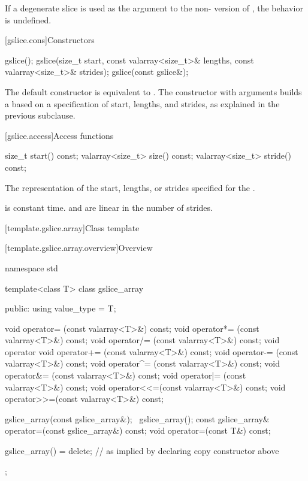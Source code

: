 \pnum
If a degenerate slice is used as the argument to the
non-
version of
,
the behavior is undefined.
%

[gslice.cons]{Constructors}

%
\begin{itemdecl}
gslice();
gslice(size_t start, const valarray<size_t>& lengths,
       const valarray<size_t>& strides);
gslice(const gslice&);
\end{itemdecl}

\begin{itemdescr}
\pnum
The default constructor is equivalent to
.
The constructor with arguments builds a
based on a specification of start, lengths, and strides, as explained
in the previous subclause.
\end{itemdescr}

[gslice.access]{Access functions}

%
%
%
\begin{itemdecl}
size_t           start()  const;
valarray<size_t> size() const;
valarray<size_t> stride() const;
\end{itemdecl}

\begin{itemdescr}
\pnum
\returns
The representation of the
start, lengths, or strides specified for the .

\pnum
\complexity
{} is constant time.  and 
are linear in the number of strides.
\end{itemdescr}

[template.gslice.array]{Class template }

[template.gslice.array.overview]{Overview}

%
%
\begin{codeblock}
namespace std {
  template<class T> class gslice_array {
  public:
    using value_type = T;

    void operator=  (const valarray<T>&) const;
    void operator*= (const valarray<T>&) const;
    void operator/= (const valarray<T>&) const;
    void operator%
    void operator+= (const valarray<T>&) const;
    void operator-= (const valarray<T>&) const;
    void operator^= (const valarray<T>&) const;
    void operator&= (const valarray<T>&) const;
    void operator|= (const valarray<T>&) const;
    void operator<<=(const valarray<T>&) const;
    void operator>>=(const valarray<T>&) const;

    gslice_array(const gslice_array&);
    ~gslice_array();
    const gslice_array& operator=(const gslice_array&) const;
    void operator=(const T&) const;

    gslice_array() = delete;    // as implied by declaring copy constructor above
  };
}
\end{codeblock}

